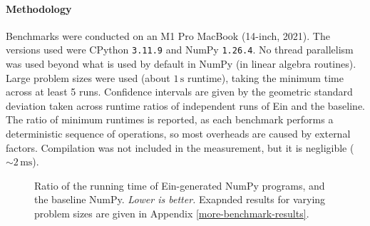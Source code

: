 \paragraph{Methodology} Benchmarks were conducted on an M1 Pro MacBook (14-inch, 2021). The versions used were CPython \texttt{3.11.9} and NumPy \texttt{1.26.4}. No thread parallelism was used beyond what is used by default in NumPy (in linear algebra routines). Large problem sizes were used (about $1\,\mathrm{s}$ runtime), taking the minimum time across at least 5 runs. Confidence intervals are given by the geometric standard deviation taken across runtime ratios of independent runs of Ein and the baseline. The ratio of minimum runtimes is reported, as each benchmark performs a deterministic sequence of operations, so most overheads are caused by external factors. Compilation was not included in the measurement, but it is negligible ($\sim 2\,\mathrm{ms}$).

\begin{figure}[b]
    \centering


    \caption{Ratio of the running time of Ein-generated NumPy programs, and the baseline NumPy. \textit{Lower is better.} Exapnded results for varying problem sizes are given in Appendix \ref{more-benchmark-results}.}
    \label{fig:benchmark-results}
\end{figure}


